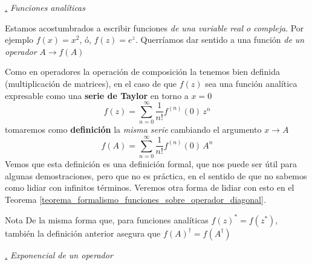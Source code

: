 \documentclass[a4paper,11pt]{book} %
\numberwithin{equation}{chapter}
\def\subsubiContadorIt{\par\addtocounter{subsubsection}{1}\underline{\it\thesubsubsection.}\hskip0.5cm \setcounter{subsubsubsectionIt}{0}}
\newcommand{\SubsubiIt}[1]{
		\subsubiContadorIt \textit{#1}
	}
\newcounter{subsubsubsectionIt}[subsubsection]
\begin{document}
			\SubsubiIt{Funciones analíticas}

Estamos acostumbrados a escribir funciones \textit{de una variable real o compleja}. Por ejemplo $f(x)= x^2$, ó, $ f(z) = e^z$. Querríamos dar sentido a una función \textit{de un operador} 
$
A \to f(A)
$


Como en operadores la operación de composición la tenemos bien definida (multiplicación de matrices), en el caso de que $f(z)$ sea una función analítica expresable como una \textbf{serie de Taylor} en torno a $x=0$ 
	\begin{equation}
	f(z) = \sum_{n=0}^\infty \frac{1}{n!} f^{(n)}(0)\,  z^n
	\end{equation}
tomaremos como \textbf{definición} la \textit{misma serie} cambiando el argumento $x\to A$
	\begin{equation}
	f(A) = \sum_{n=0}^\infty \frac{1}{n!} f^{(n)}(0)\,  A^n
	\end{equation}
Vemos que esta definición es una definición formal, que nos puede ser útil para algunas demostraciones, pero que no es práctica, en el sentido de que no sabemos como lidiar con infinitos términos. Veremos otra forma de lidiar con esto en el Teorema \ref{teorema_formalismo_funciones_sobre_operador_diagonal}.


\begin{mybox_blue}{Nota}
De la misma forma que, para funciones analíticas $f(z)^* = f(z^*)$, también la definición anterior asegura que $f(A)^\dagger = f(A^\dagger)$
\end{mybox_blue}


			\SubsubiIt{Exponencial de un operador}
\end{document}
